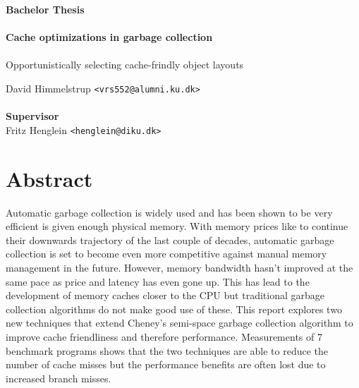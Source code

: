 \documentclass[a4paper,oneside]{memoir}
\begin{document}
    \thispagestyle{empty}
    \begin{adjustwidth}{-3cm}{-1.5cm}
    \vspace*{-1cm}
    \textbf{\Huge Bachelor Thesis} \\
    \vspace*{2.5cm} \\
    \textbf{\Huge Cache optimizations in garbage collection} \\
    \vspace*{.1cm} \\
    {\huge Opportunistically selecting cache-frindly object layouts} \\
    \begin{tabbing}
    David Himmelstrup \hspace{1cm} \= \texttt{<vrs552@alumni.ku.dk>} \\
    \\[12cm]
    \textbf{\Large Supervisor} \\
    Fritz Henglein \> \texttt{<henglein@diku.dk>} \\
    \end{tabbing}
    \end{adjustwidth}
    \newpage
    \ClearWallPaper

\chapter*{Abstract}

Automatic garbage collection is widely used and has been shown to be very
efficient is given enough physical memory. With memory prices like to continue
their downwards trajectory of the last couple of decades, automatic garbage
collection is set to become even more competitive against manual memory management
in the future. However, memory bandwidth hasn't improved at the same pace as price
and latency has even gone up. This has lead to the development of memory caches
closer to the CPU but traditional garbage collection algorithms do not make good
use of these. This report explores two new techniques that extend Cheney's
semi-space garbage collection algorithm to improve cache friendliness and therefore
performance. Measurements of 7 benchmark programs shows that the two techniques
are able to reduce the number of cache misses but the performance benefits are
often lost due to increased branch misses.
\end{document}

